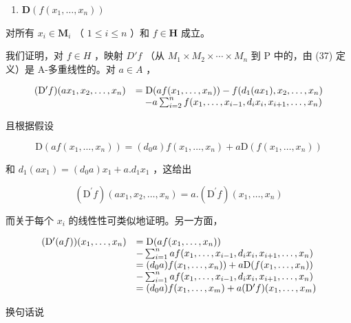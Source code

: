 \begin{enumerate}
\def\labelenumi{(\arabic{enumi})}
\setcounter{enumi}{36}
\tightlist
\item
  \(\mathbf{D}(f(x_1, \ldots, x_n))\)
\end{enumerate}

对所有 \(x_{i} \in \mathbf{M}_{i}\) （ \(1 \leqslant i \leqslant n\) ）和 \(f \in \mathbf{H}\) 成立。

我们证明，对 \(f \in H\) ，映射 \(D'f\) （从 \(M_{1} \times M_{2} \times \cdots \times M_{n}\) 到 P 中的，由 (37) 定义）是 A-多重线性的。对 \(a \in A\) ，

\[
\begin{array}{r l} (\mathrm{D} ^ {\prime} f) (a x _ {1}, x _ {2}, \ldots , x _ {n}) & = \mathrm{D} (a f (x _ {1}, \ldots , x _ {n})) - f (d _ {1} (a x _ {1}), x _ {2}, \ldots , x _ {n}) \\ & \quad - a \sum_ {i = 2} ^ {n} f (x _ {1}, \ldots , x _ {i - 1}, d _ {i} x _ {i}, x _ {i + 1}, \ldots , x _ {n}) \end{array}
\]

且根据假设

\[
\mathrm{D} (a f (x _ {1}, \dots , x _ {n})) = (d _ {0} a) f (x _ {1}, \dots , x _ {n}) + a \mathrm{D} (f (x _ {1}, \dots , x _ {n}))
\]

和 \(d_{1}(ax_{1}) = (d_{0}a)x_{1} + a.d_{1}x_{1}\) ，这给出

\[
(\mathrm{D} ^ {\prime} f) (a x _ {1}, x _ {2}, \dots , x _ {n}) = a. (\mathrm{D} ^ {\prime} f) (x _ {1}, \dots , x _ {n})
\]

而关于每个 \(x_{i}\) 的线性性可类似地证明。另一方面，

\[
\begin{array}{r l} (\mathrm{D} ^ {\prime} (a f)) (x _ {1}, \dots , x _ {n}) & = \mathrm{D} (a f (x _ {1}, \dots , x _ {n})) \\ & - \sum_ {i = 1} ^ {n} a f (x _ {1}, \dots , x _ {i - 1}, d _ {i} x _ {i}, x _ {i + 1}, \dots , x _ {n}) \\ & = (d _ {0} a) f (x _ {1}, \dots , x _ {n})) + a \mathrm{D} (f (x _ {1}, \dots , x _ {n})) \\ & - \sum_ {i = 1} ^ {n} a f (x _ {1}, \dots , x _ {i - 1}, d _ {i} x _ {i}, x _ {i + 1}, \dots , x _ {n}) \\ & = (d _ {0} a) f (x _ {1}, \dots , x _ {m}) + a (\mathrm{D} ^ {\prime} f) (x _ {1}, \dots , x _ {m}) \end{array}
\]

换句话说

